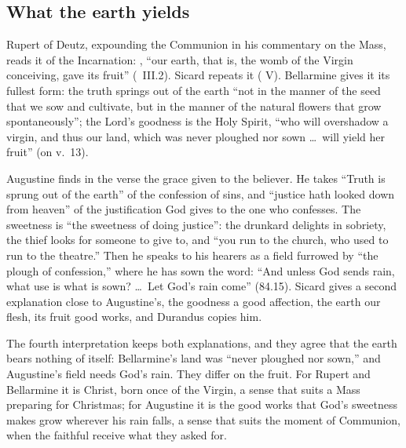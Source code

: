 \subsection{What the earth yields}

Rupert of Deutz, expounding the Communion in his commentary on the Mass,
reads it of the Incarnation: , ``our earth, that is, the womb of the Virgin
conceiving, gave its fruit'' (~III.2). Sicard repeats it
( V). Bellarmine gives it its fullest form: the truth springs
out of the earth ``not in the manner of the seed that we sow and cultivate,
but in the manner of the natural flowers that grow spontaneously''; the
Lord's goodness is the Holy Spirit, ``who will overshadow a virgin, and thus
our land, which was never ploughed nor sown \dots\ will yield her fruit'' (on
v.~13).

Augustine finds in the verse the grace given to the believer. He takes
``Truth is sprung out of the earth'' of the confession of sins, and ``justice
hath looked down from heaven'' of the justification God gives to the one who
confesses. The sweetness is ``the sweetness of doing justice'': the drunkard
delights in sobriety, the thief looks for someone to give to, and ``you run
to the church, who used to run to the theatre.'' Then he speaks to his
hearers as a field furrowed by ``the plough of confession,'' where he has sown
the word: ``And unless God sends rain, what use is what is sown? \dots\ Let
God's rain come'' (84.15). Sicard gives a second explanation close to
Augustine's, the goodness a good affection, the earth our flesh, its fruit
good works, and Durandus copies him.

The fourth interpretation keeps both explanations, and they agree that the
earth bears nothing of itself: Bellarmine's land was ``never ploughed nor
sown,'' and Augustine's field needs God's rain. They differ on the fruit. For
Rupert and Bellarmine it is Christ, born once of the Virgin, a sense that
suits a Mass preparing for Christmas; for Augustine it is the good works that
God's sweetness makes grow wherever his rain falls, a sense that suits the
moment of Communion, when the faithful receive what they asked for.

